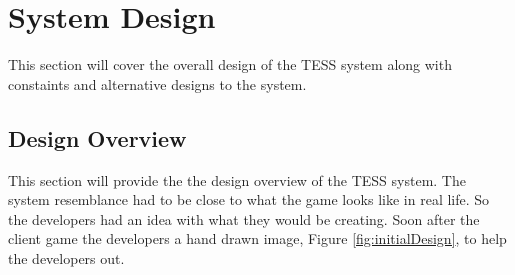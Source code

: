 \documentclass{article}
\begin{document}
\section{System Design}
This section will cover the overall design of the TESS system along with constaints and alternative designs to the system.

\subsection{Design Overview}
This section will provide the the design overview of the TESS system. The system resemblance had to be close to what the game looks like in real life. So the developers had an idea with what they would be creating. Soon after the client game the developers a hand drawn image, Figure \ref{fig:initialDesign}, to help the developers out.
\end{document}
